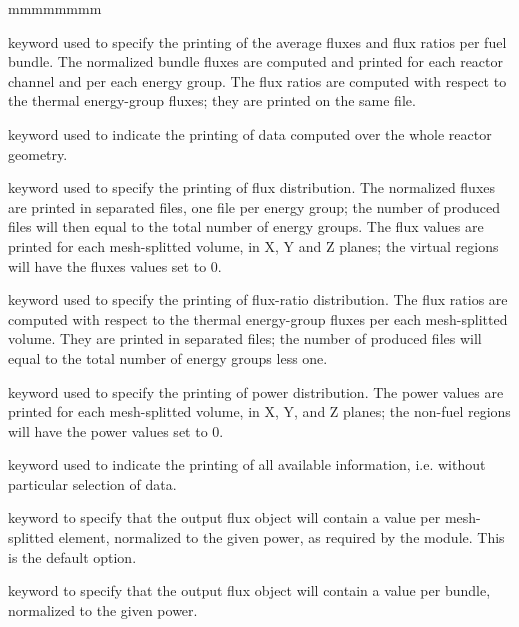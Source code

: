 \begin{ListeDeDescription}{mmmmmmmm}
\item[\moc{MAP}] keyword used to specify the printing of the average fluxes
and flux ratios per fuel bundle. The normalized bundle fluxes are computed
and printed for each reactor channel and per each energy group. The flux
ratios are computed with respect to the thermal energy-group fluxes; they
are printed on the same file.

\item[\moc{DISTR}] keyword used to indicate the printing of data
computed over the whole reactor geometry. 

\item[\moc{FLUX}] keyword used to specify the printing of flux distribution.
The normalized fluxes are printed in separated files, one file per energy
group; the number of produced files will then equal to the total number
of energy groups. The flux values are printed for each mesh-splitted volume,
in X, Y and Z planes; the virtual regions will have the fluxes values set to 0.

\item[\moc{RATIO}] keyword used to specify the printing of flux-ratio
distribution. The flux ratios are computed with respect to the thermal
energy-group fluxes per each mesh-splitted volume. They are printed
in separated files; the number of produced files will equal to the total
number of energy groups less one.

\item[\moc{POWER}] keyword used to specify the printing of power
distribution. The power values are printed for each mesh-splitted volume,
in X, Y, and Z planes; the non-fuel regions will have the power values set to 0.

\item[\moc{ALL}] keyword used to indicate the printing of all available
information, i.e. without particular selection of data.

\item[\moc{NORM}] keyword to specify that the output flux object will contain a value per mesh-splitted element, normalized 
to the given power, as required by the  module. This is the default option.

\item[\moc{BUND}] keyword to specify that the output flux object will contain a value per bundle, normalized 
to the given power.

\end{ListeDeDescription}
\clearpage
